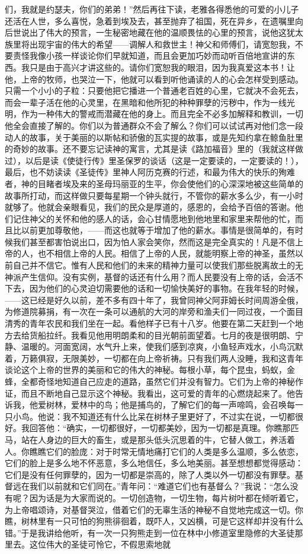 们，我就是约瑟夫，你们的弟弟！”然后再往下读，老雅各得悉他的可爱的小儿子还活在人世，多么喜悦，急着到埃及去，甚至抛弃了祖国，死在异乡，在遗嘱里向后世说出了伟大的预言，一生秘密地藏在他的温顺畏怯的心里的预言，说他这犹太族里将出现宇宙的伟大的希望——调解人和救世主！神父和师傅们，请宽恕我，不要责怪我像小孩一样谈论你们早就知道，而且会更加巧妙而动听百倍地宣讲的东西。我只是由于高兴才讲这些的。请你们宽恕我的眼泪，因为我真爱这本书！让他，上帝的牧师，也哭泣一下，他就可以看到听他诵读的人的心会怎样受到感动。只需一个小小的子粒：只要他把它播进一个普通老百姓的心里，它就决不会死去，而会一辈子活在他的心灵里，在黑暗和他所犯的种种罪孽的污秽中，作为一线光明，作为一种伟大的警戒而潜藏在他的身上。而且完全不必多加解释和教训，一切他全会直接了解的。你们以为普通群众不会了解么？你们可以试试再对他们念一段动人的故事，关于美丽的以斯帖和骄傲的瓦实提的故事，或是先知约拿在鲸鱼肚里的奇妙的故事。还不要忘记读神的寓言，尤其是读《路加福音》里的（我就这样做过），以后是读《使徒行传》里圣保罗的谈话（这是一定要读的，一定要读的！），最后，也不妨读读《圣徒传》里神人阿历克赛的行述，和最为伟大的快乐的殉难者，神的目睹者埃及来的圣母玛丽亚的生平，你会使他们的心深深地被这些简单的故事所打动，而这样做只要每星期一个钟头就行，不管你的薪水多么少，有一小时就够了。他就会亲眼看见，我们的民众是厚道的，感恩的，会给予百倍的答谢。他们记住神父的关怀和他的感人的话，会心甘情愿地到他地里和家里来帮他的忙，而且比以前更加尊敬他，——而这也就等于增加了他的薪水。事情是很简单的，有时候我们甚至都害怕说出口，因为怕人家会笑你，然而这是完全真实的！凡是不信上帝的人，也不相信上帝的人民。相信了上帝的人民，就能明察上帝的神圣，虽然以前自己并不信它。惟有人民和他们的未来的精神力量可以使我们那些脱离故土的无神派产生信仰。没有实例，基督的话还有什么用？而人民要没有上帝的话，会活不下去，因为他们的心灵迫切需要他的话和一切愉快美好的事物。在我年轻的时候，——这已经是好久以前，差不多有四十年了，我曾同神父阿菲姆长时间周游全俄，为修道院募捐，有一次在一条可以通航的大河的岸旁和渔夫们一同过夜，一个面目清秀的青年农民和我们坐在一起。看他样子已有十八岁。他要在第二天赶到一个地方去给货船拉纤。我看见他用明朗柔和的目光朝前面望着。七月的夜是很明朗、宁静、温暖的。河面宽阔，水气升上来，使我们感到凉爽，小鱼轻声戏水，小鸟沉默着，万籁俱寂，无限美妙，一切都在向上帝祈祷。只有我们两人没睡，我和这青年谈论这个上帝的世界的美丽和它的伟大的神秘。每根小草，每个昆虫，蚂蚁，金蜂，全都奇怪地知道自己应走的道路，虽然它们并没有智力。它们为上帝的神秘作证，而且不断地自己显示这个神秘。我看出，这可爱的青年的心燃烧起来了。他告诉我，他爱树林，爱林中的鸟；他是捕鸟的，了解它们的每一声啼鸣，会召唤每一只小鸟。他说：我不知道还有什么比呆在树林子里更好了，不过实在说，一切都很好。我回答他：“确实，一切都很好，一切都美妙，因为一切都是真理。你瞧那匹马，站在人身边的巨大的畜生，或是那头低头沉思着的牛，它替人做工，养活着人。你瞧瞧它们的脸庞：对于时常无情地痛打它们的人类是多么温顺，多么依恋，它们的脸上是多么地不怀恶意，多么地信任，多么地美丽。甚至想想都觉得感动：它们是没有任何罪孽的，因为一切都是崇高的，除了人类以外一切都没有罪孽。基督远在我们以前就和它们同在。”青年问：“难道它们也有基督么？”我说：“怎么没有呢？因为话是为大家而说的。一切创造物，一切生物，每片树叶都在倾听着它，为上帝唱颂诗，对基督哭泣，借着它们的无辜生活的神秘不自觉地完成这一切。你瞧，树林里有一只可怕的狗熊徘徊着，既吓人，又凶横，可是它这样却并没有什么错。”于是我讲给他听，有一次一只狗熊走到一位在林中小修道室里隐修的大圣徒那里去。这位伟大的圣徒可怜它，不假思索地就
